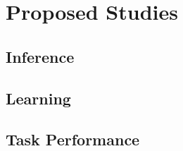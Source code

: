 \documentclass[12pt]{article}
\begin{document}
\pagebreak
\section{Proposed Studies}
\subsection{Inference}

\subsection{Learning}

\subsection{Task Performance}
\end{document}
